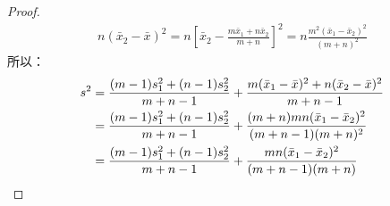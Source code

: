 \begin{proof}
\begin{gather*}
		n(\bar{x}_2-\bar{x})^2=n\left[\bar{x}_2-\frac{m\bar{x}_1+n\bar{x}_2}{m+n}\right]^2=n\frac{m^2(\bar{x}_1-\bar{x}_2)^2}{(m+n)^2}
	\end{gather*}
	所以：
	\begin{align*}
		s^2&=\frac{(m-1)s_1^2+(n-1)s_2^2}{m+n-1}+\frac{m(\bar{x}_1-\bar{x})^2+n(\bar{x}_2-\bar{x})^2}{m+n-1} \\
		&=\frac{(m-1)s_1^2+(n-1)s_2^2}{m+n-1}+\frac{(m+n)mn(\bar{x}_1-\bar{x}_2)^2}{(m+n-1)(m+n)^2} \\
		&=\frac{(m-1)s_1^2+(n-1)s_2^2}{m+n-1}+\frac{mn(\bar{x}_1-\bar{x}_2)^2}{(m+n-1)(m+n)}\qedhere
	\end{align*}
\end{proof}

